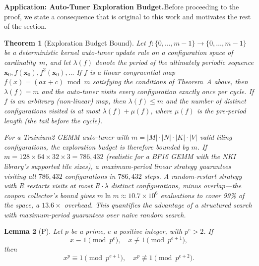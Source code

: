 \documentclass[12pt]{article}
\newcommand{\KernelConfig}{\mathbf{x}}           %
\newcommand{\SchedulePeriod}{\lambda}             %
\newtheorem{theorem}{Theorem}[section]
\newtheorem{lemma}[theorem]{Lemma}
\begin{document}
\medskip
\noindent\textbf{Application: Auto-Tuner Exploration Budget.}\quad Before proceeding to the proof, we state a consequence that is original to this work and motivates the rest of the section.

\begin{theorem}[Exploration Budget Bound]\label{thm:exploration-budget}
Let $f: \{0, \ldots, m-1\} \to \{0, \ldots, m-1\}$ be a deterministic kernel auto-tuner update rule on a configuration space of cardinality~$m$, and let $\SchedulePeriod(f)$ denote the period of the ultimately periodic sequence $\KernelConfig_0, f(\KernelConfig_0), f^2(\KernelConfig_0), \ldots$ If $f$ is a linear congruential map $f(x) = (ax + c) \bmod m$ satisfying the conditions of Theorem~A above, then $\SchedulePeriod(f) = m$ and the auto-tuner visits every configuration exactly once per cycle. If $f$ is an arbitrary (non-linear) map, then $\SchedulePeriod(f) \le m$ and the number of distinct configurations visited is at most $\SchedulePeriod(f) + \mu(f)$, where $\mu(f)$ is the pre-period length (the tail before the cycle).

For a Trainium2 GEMM auto-tuner with $m = |M| \cdot |N| \cdot |K| \cdot |V|$ valid tiling configurations, the exploration budget is therefore bounded by $m$. If $m = 128 \times 64 \times 32 \times 3 = 786{,}432$ (realistic for a BF16 GEMM with the NKI library's supported tile sizes), a maximum-period linear strategy guarantees visiting all $786{,}432$ configurations in $786{,}432$ steps. A random-restart strategy with $R$ restarts visits at most $R \cdot \SchedulePeriod$ distinct configurations, minus overlap---the coupon collector's bound gives $m \ln m \approx 10.7 \times 10^6$ evaluations to cover 99\% of the space, a $13.6\times$ overhead. This quantifies the advantage of a structured search with maximum-period guarantees over na\"ive random search.
\end{theorem}

\begin{lemma}[P]
Let $p$ be a prime, $e$ a positive integer, with $p^e > 2$. If
\[
x \equiv 1 \pmod{p^e}, \quad x \not\equiv 1 \pmod{p^{e+1}},
\]
then
\[
x^p \equiv 1 \pmod{p^{e+1}}, \quad x^p \not\equiv 1 \pmod{p^{e+2}}.
\]
\end{lemma}
\end{document}
